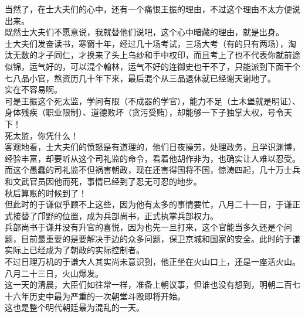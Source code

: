 \begin{multicols}{\theparacolNo}
当然了，在士大夫们的心中，还有一个痛恨王振的理由，不过这个理由不太方便说出来。\\

既然士大夫们不愿意说，我就替他们说吧，这个心中暗藏的理由，就是出身。\\

士大夫们发奋读书，寒窗十年，经过几十场考试，三场大考（有的只有两场），淘汰无数的才子同仁，才换来了头上乌纱和手中权印，而且考上了也不代表你就前途似锦，运气好的，可以混个翰林，运气不好的连御史也干不了，只能派到下面干个七八品小官，熬资历几十年下来，最后混个从三品退休就已经谢天谢地了。\\

实在不容易啊。\\

可是王振这个死太监，学问有限（不成器的学官），能力不足（土木堡就是明证）、身体残疾（职业限制）、道德败坏（贪污受贿），却能够一下子独掌大权，号令天下！\\

死太监，你凭什么！\\

客观地看，士大夫们的愤怒是有道理的，他们日夜操劳，处理政务，且学识渊博，经验丰富，却要听从这个司礼监的命令，看着他胡作非为，也确实让人难以忍受。\\

而这个愚蠢的司礼监不但祸害朝政，现在还害得国将不国，惊涛四起，几十万士兵和文武官员因他而死，事情已经到了忍无可忍的地步。\\

秋后算账的时候到了！\\

但此时的于谦似乎顾不上这些，因为他有太多的事情要忙，八月二十一日，于谦正式接替了邝野的位置，成为兵部尚书，正式执掌兵部权力。\\

兵部尚书于谦并没有升官的喜悦，因为也先一旦打来，这个官能当多久还是个问题，目前最重要的是要解决手边的众多问题，保卫京城和国家的安全。此时的于谦实际上已经成为了朝政的实际控制者。\\

不过日理万机的于谦大人其实尚未意识到，他正坐在火山口上，还是一座活火山。\\

八月二十三日，火山爆发。\\

这一天的清晨，大臣们如往常一样，准备上朝议事，但谁也没有想到，明朝二百七十六年历史中最为严重的一次朝堂斗殴即将开始。\\

这也是整个明代朝廷最为混乱的一天。\\


\end{multicols}

